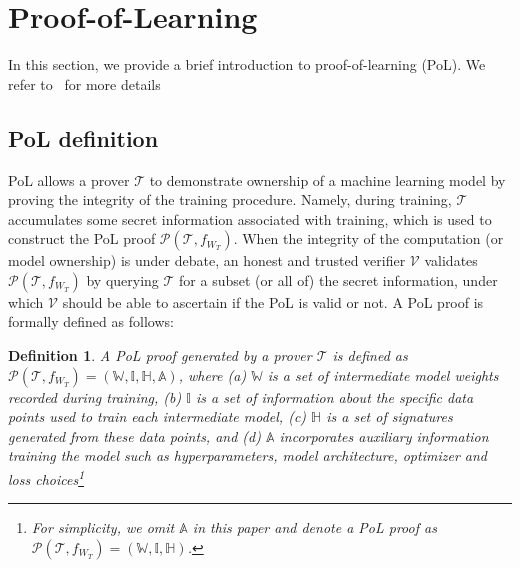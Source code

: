 \documentclass[conference]{IEEEtran}
\newtheorem{definition}{Definition}
\newcommand{\Prov}{\mathcal{T}\xspace}
\newcommand{\Verif}{\mathcal{V}\xspace}
\newcommand{\Proof}{\mathcal{P}\xspace}
\newcommand{\WWW}{\mathbb{W}\xspace}
\newcommand{\III}{\mathbb{I}\xspace}
\newcommand{\HHH}{\mathbb{H}\xspace}
\newcommand{\AAA}{\mathbb{A}\xspace}
\begin{document}
 
\section{Proof-of-Learning}
\label{sec:background}

In this section, we provide a brief introduction to proof-of-learning (PoL). 
We refer to~\cite{PoL} for more details


\subsection{PoL definition}
\label{sec:definition}

PoL allows a prover $\Prov$ to demonstrate {ownership\EndAccSupp{}} of a {machine\EndAccSupp{}} {learning\EndAccSupp{}} model by  proving the integrity of the training procedure.
Namely, during training, $\Prov$ accumulates some secret {information\EndAccSupp{}} {associated\EndAccSupp{}} with training, which is {used\EndAccSupp{}} to construct the PoL proof $\Proof(\Prov, f_{W_T})$.
When the integrity of the computation (or model ownership) is under debate, an honest and trusted verifier $\Verif$ validates $\Proof(\Prov, f_{W_T})$ by {querying\EndAccSupp{}} $\Prov$ for a subset (or all of) the secret information, under which $\Verif$ should be able to ascertain if the PoL is valid or not.
A PoL proof is formally {defined\EndAccSupp{}} as follows:
\begin{definition}
A PoL proof generated by a prover $\Prov$ is defined as $\Proof(\Prov, f_{W_T}) = (\WWW, \III, \HHH, \AAA)$, 
where 
(a) $\WWW$ is a {set\EndAccSupp{}} of intermediate model weights recorded during training,
(b) $\III$ is a {set\EndAccSupp{}} of {information\EndAccSupp{}} about the {specific\EndAccSupp{}} {data\EndAccSupp{}} points used to train each intermediate model, 
(c) $\HHH$ is a set of {signatures\EndAccSupp{}} generated from these data points, and 
(d) $\AAA$ incorporates auxiliary {information\EndAccSupp{}} training the model such as hyperparameters, model architecture, {optimizer\EndAccSupp{}} and loss choices\footnote{For simplicity, we omit $\AAA$ in this paper and denote a PoL proof as $\Proof(\Prov, f_{W_T}) = (\WWW, \III, \HHH)$.} 
\end{definition}
\end{document}
